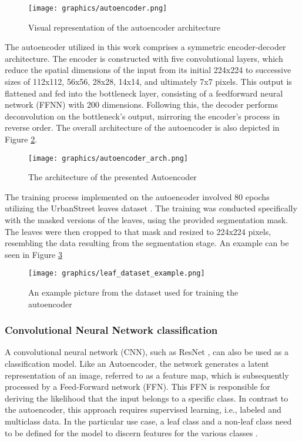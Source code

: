 \documentclass[draft,final]{vutinfth} %
\begin{document}
\begin{figure}
    \centering
    \texttt{[image: graphics/autoencoder.png]}
    \caption{Visual representation of the autoencoder architecture \cite{kumawat_everything_2023}}
    \label{fig:autoencoders}
\end{figure}

The autoencoder utilized in this work comprises a symmetric encoder-decoder architecture. The encoder is constructed with five convolutional layers, which reduce the spatial dimensions of the input from its initial 224x224 to successive sizes of 112x112, 56x56, 28x28, 14x14, and ultimately 7x7 pixels. This output is flattened and fed into the bottleneck layer, consisting of a feedforward neural network (FFNN) with 200 dimensions. Following this, the decoder performs deconvolution on the bottleneck's output, mirroring the encoder's process in reverse order. The overall architecture of the autoencoder is also depicted in Figure \ref{fig:autoencoder_arch}.
\begin{figure}
    \centering
    \texttt{[image: graphics/autoencoder\_arch.png]}
    \caption{The architecture of the presented Autoencoder}
    \label{fig:autoencoder_arch}
\end{figure}

The training process implemented on the autoencoder involved 80 epochs utilizing the UrbanStreet leaves dataset \cite{yang_urban_2023}. The training was conducted specifically with the masked versions of the leaves, using the provided segmentation mask. The leaves were then cropped to that mask and resized to 224x224 pixels, resembling the data resulting from the segmentation stage. An example can be seen in Figure \ref{fig:leaf_example}

\begin{figure}
    \centering
    \texttt{[image: graphics/leaf\_dataset\_example.png]}
    \caption{An example picture from the dataset used for training the autoencoder}
    \label{fig:leaf_example}
\end{figure}

\subsubsection{Convolutional Neural Network classification}
A convolutional neural network (CNN), such as ResNet \cite{he_deep_2015}, can also be used as a classification model. Like an Autoencoder, the network generates a latent representation of an image, referred to as a feature map, which is subsequently processed by a Feed-Forward network (FFN). This FFN is responsible for deriving the likelihood that the input belongs to a specific class. In contrast to the autoencoder, this approach requires supervised learning, i.e., labeled and multiclass data. In the particular use case, a leaf class and a non-leaf class need to be defined for the model to discern features for the various classes \cite{he_deep_2015}.
\end{document}
